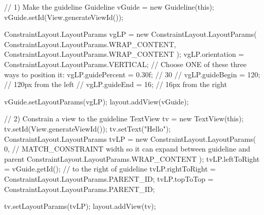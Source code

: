 \documentclass{report}
\begin{document}
\begin{itemize}
\begin{javacode}
                // 1) Make the guideline
                Guideline vGuide = new Guideline(this);
                vGuide.setId(View.generateViewId());

                ConstraintLayout.LayoutParams vgLP = new ConstraintLayout.LayoutParams(
                        ConstraintLayout.LayoutParams.WRAP_CONTENT,
                        ConstraintLayout.LayoutParams.WRAP_CONTENT
                );
                vgLP.orientation = ConstraintLayout.LayoutParams.VERTICAL;
                // Choose ONE of these three ways to position it:
                vgLP.guidePercent = 0.30f;   // 30%
                // vgLP.guideBegin  = 120;    // 120px from the left
                // vgLP.guideEnd    = 16;     // 16px from the right

                vGuide.setLayoutParams(vgLP);
                layout.addView(vGuide);

                // 2) Constrain a view to the guideline
                TextView tv = new TextView(this);
                tv.setId(View.generateViewId());
                tv.setText("Hello");
                ConstraintLayout.LayoutParams tvLP = new ConstraintLayout.LayoutParams(
                0,  // MATCH_CONSTRAINT width so it can expand between guideline and parent
                ConstraintLayout.LayoutParams.WRAP_CONTENT
                );
                tvLP.leftToRight = vGuide.getId();                       // to the right of guideline
                tvLP.rightToRight = ConstraintLayout.LayoutParams.PARENT_ID;
                tvLP.topToTop = ConstraintLayout.LayoutParams.PARENT_ID;

                tv.setLayoutParams(tvLP);
                layout.addView(tv);


\end{javacode}
\end{itemize}
\end{document}
